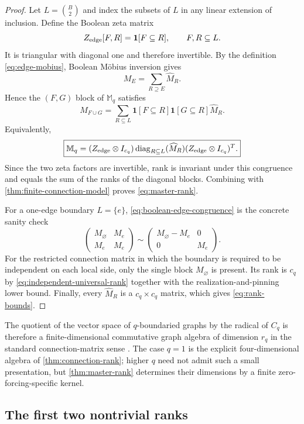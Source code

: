 \documentclass[11pt,reqno]{amsart}
\theoremstyle{definition}
\begin{document}
\begin{proof}
Let $L=\binom B2$ and index the subsets of $L$ in any linear extension of
inclusion.  Define the Boolean zeta matrix
\[
 Z_{\rm edge}[F,R]=\mathbf1[F\subseteq R],
 \qquad F,R\subseteq L.
\]
It is triangular with diagonal one and therefore invertible.  By the definition
\eqref{eq:edge-mobius}, Boolean M\"obius inversion gives
\[
 M_E=\sum_{R\supseteq E}\widehat M_R.
\]
Hence the $(F,G)$ block of $\mathbb M_q$ satisfies
\[
 M_{F\cup G}
 =\sum_{R\subseteq L}
   \mathbf1[F\subseteq R]\mathbf1[G\subseteq R]\widehat M_R.
\]
Equivalently,
\begin{equation}\label{eq:boolean-edge-congruence}
 \boxed{
 \mathbb M_q
 =(Z_{\rm edge}\otimes I_{c_q})
   \operatorname{diag}_{R\subseteq L}(\widehat M_R)
   (Z_{\rm edge}\otimes I_{c_q})^T.
 }
\end{equation}
Since the two zeta factors are invertible, rank is invariant under this
congruence and equals the sum of the ranks of the diagonal blocks.  Combining
with \cref{thm:finite-connection-model} proves \eqref{eq:master-rank}.

For a one-edge boundary $L=\{e\}$, \eqref{eq:boolean-edge-congruence} is the
concrete sanity check
\[
 \begin{pmatrix}
 M_{\varnothing}&M_e\\
 M_e&M_e
 \end{pmatrix}
 \sim
 \begin{pmatrix}
 M_{\varnothing}-M_e&0\\
 0&M_e
 \end{pmatrix}.
\]
For the restricted connection matrix in which the boundary is required to be
independent on each local side, only the single block $M_{\varnothing}$ is
present.  Its rank is $c_q$ by \eqref{eq:independent-universal-rank} together
with the realization-and-pinning lower bound.  Finally, every
$\widehat M_R$ is a $c_q\times c_q$ matrix, which gives
\eqref{eq:rank-bounds}.
\end{proof}

The quotient of the vector space of $q$-boundaried graphs by the radical of
$C_q$ is therefore a finite-dimensional commutative graph algebra of dimension
$r_q$ in the standard connection-matrix sense \cite{Lovasz2006}.  The case
$q=1$ is the explicit four-dimensional algebra of
\cref{thm:connection-rank}; higher $q$ need not admit such a small presentation,
but \cref{thm:master-rank} determines their dimensions by a finite
zero-forcing-specific kernel.

\subsection{The first two nontrivial ranks}
\end{document}
